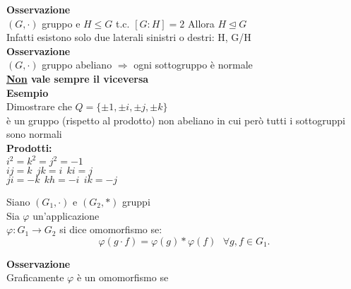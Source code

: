 \documentclass[12px]{article}
\begin{document}
	 \textbf{Osservazione}\\
	 $(G,\cdot)$ gruppo e $H\leq G$ t.c.  $[G:H] = 2$ Allora  $H\trianglelefteq G$\\
	 Infatti esistono solo due laterali sinistri o destri: H, G/H\\
	 \textbf{Osservazione}\\
	 $(G,\cdot)$ gruppo abeliano $\Rightarrow$ ogni sottogruppo è normale\\
	 \textbf{\underline{Non} vale sempre il viceversa}\\
	 \textbf{Esempio}\\
	 Dimostrare che $Q = \lbrace \pm 1, \pm i,\pm j,\pm k\rbrace$\\ 
	 è un gruppo (rispetto al prodotto)
	 non abeliano in cui però tutti i sottogruppi sono normali\\
	  \textbf{Prodotti:}\\
	  $i^2 = k^2 = j^2 = -1$\\
	   $ij = k \ \ jk = i \ \ ki = j$\\
	    $ji = -k \ \ kh = -i \ \ ik = -j$
	 \begin{defi}
		Siano $(G_1,\cdot)$ e $(G_2,*)$ gruppi\\
		Sia $ \varphi$ un'applicazione\\
		$
		\varphi: G_1  \rightarrow G_2$ si dice omomorfismo se:
		\[
		\varphi(g\cdot f) = \varphi(g)* \varphi(f) \ \ \ \forall g,f\in G_1
		.\] 
		
	\end{defi}
	\textbf{Osservazione}\\
	Graficamente $ \varphi$ è un omomorfismo se
	
\end{document}
